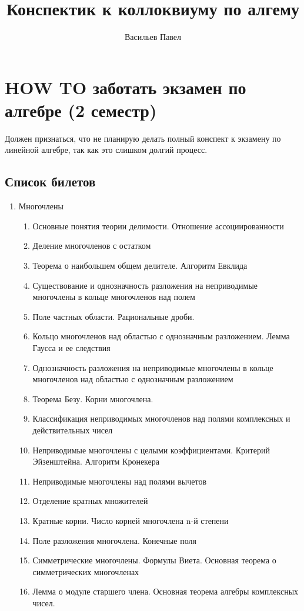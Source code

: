 \documentclass[a4paper]{article}
\title{Конспектик к коллоквиуму по алгему}
\author{Васильев Павел}
\begin{document}
\section*{HOW TO заботать экзамен по алгебре (2 семестр)}

Должен признаться, что не планирую делать полный конспект к экзамену по линейной алгебре, так как это слишком долгий процесс.

\subsection*{Список билетов}
\begin{enumerate}
\item Многочлены
\begin{enumerate}
\item Основные понятия теории делимости. Отношение ассоциированности
\item Деление многочленов с остатком
\item Теорема о наибольшем общем делителе. Алгоритм Евклида
\item Существование и однозначность разложения на неприводимые многочлены в кольце многочленов над полем
\item Поле частных области. Рациональные дроби.
\item Кольцо многочленов над областью с однозначным разложением. Лемма Гаусса и ее следствия
\item Однозначность разложения на неприводимые многочлены в кольце многочленов над областью с однозначным разложением
\item Теорема Безу. Корни многочлена.
\item Классификация неприводимых многочленов над полями комплексных и действительных чисел
\item Неприводимые многочлены с целыми коэффициентами. Критерий Эйзенштейна. Алгоритм Кронекера
\item Неприводимые многочлены над полями вычетов
\item Отделение кратных множителей
\item Кратные корни. Число корней многочлена n-й степени
\item Поле разложения многочлена. Конечные поля
\item Симметрические многочлены. Формулы Виета. Основная теорема о симметрических многочленах
\item Лемма о модуле старшего члена. Основная теорема алгебры комплексных чисел.
\end{enumerate}


\end{enumerate}
\end{document}
